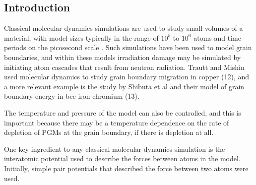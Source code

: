 
\subsection{Introduction}

Classical molecular dynamics simulations are used to study small volumes of a material, with model sizes typically in the range of $10^5$ to $10^6$ atoms and time periods on the picosecond scale \cite{tungstenmd}.  Such simulations have been used to model grain boundaries, and within these models irradiation damage may be simulated by initiating atom cascades that result from neutron radiation.  Trautt and Mishin used molecular dynamics to study grain boundary migration in copper (12), and a more relevant example is the study by Shibuta et al and their model of grain boundary energy in bcc iron-chromium (13).

The temperature and pressure of the model can also be controlled, and this is important because there may be a temperature dependence on the rate of depletion of PGMs at the grain boundary, if there is depletion at all.

One key ingredient to any classical molecular dynamics simulation is the interatomic potential used to describe the forces between atoms in the model.  Initially, simple pair potentials that described the force between two atoms were used.